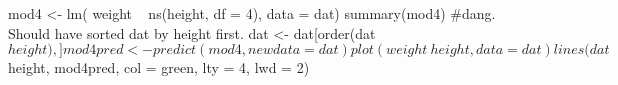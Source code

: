 \begin{Schunk}
\begin{Sinput}
 mod4 <- lm( weight ~ ns(height, df = 4), data = dat) 
 summary(mod4)
 #dang. Should have sorted dat by height first.
 dat <- dat[order(dat$height), ] 
 mod4pred <- predict(mod4, newdata = dat)
 plot(weight ~ height, data = dat) 
 lines(dat$height, mod4pred, col = green, lty = 4, lwd = 2)
\end{Sinput}
\end{Schunk}
